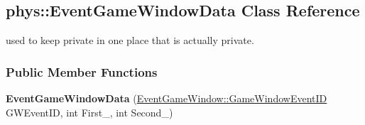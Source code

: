 \hypertarget{classphys_1_1EventGameWindowData}{
\subsection{phys::EventGameWindowData Class Reference}
\label{classphys_1_1EventGameWindowData}
}


used to keep private in one place that is actually private.  


\subsubsection*{Public Member Functions}
\begin{DoxyCompactItemize}
\item 
\hypertarget{classphys_1_1EventGameWindowData_a2b7b09702492bb6a83be2da2a70814c2}{
{\bfseries EventGameWindowData} (\hyperlink{classphys_1_1EventGameWindow_a45225255070513d3cff88cdfea25cc09}{EventGameWindow::GameWindowEventID} GWEventID, int First\_\-, int Second\_\-)}
\label{classphys_1_1EventGameWindowData_a2b7b09702492bb6a83be2da2a70814c2}

\end{DoxyCompactItemize}
